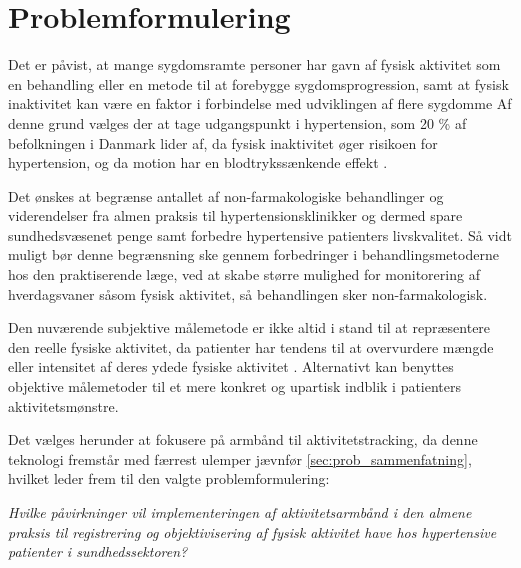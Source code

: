 \section{Problemformulering}


Det er påvist, at mange sygdomsramte personer har gavn af fysisk aktivitet som en behandling eller en metode til at forebygge sygdomsprogression, samt at fysisk inaktivitet kan være en faktor i forbindelse med udviklingen af flere sygdomme \citep{motionsraad2007,pedersen2011}
Af denne grund vælges der at tage udgangspunkt i hypertension, som 20 \% af befolkningen i Danmark lider af, da fysisk inaktivitet øger risikoen for hypertension, og da motion har en blodtrykssænkende effekt \citep{pedersen2011,olsen2015}. 

Det ønskes at begrænse antallet af non-farmakologiske behandlinger og viderendelser fra almen praksis til hypertensionsklinikker og dermed spare sundhedsvæsenet penge samt forbedre hypertensive patienters livskvalitet. Så vidt muligt bør denne begrænsning ske gennem forbedringer i behandlingsmetoderne hos den praktiserende læge, ved at skabe større mulighed for monitorering af hverdagsvaner såsom fysisk aktivitet, så behandlingen sker non-farmakologisk.

Den nuværende subjektive målemetode er ikke altid i stand til at repræsentere den reelle fysiske aktivitet, da patienter har tendens til at overvurdere mængde eller intensitet af deres ydede fysiske aktivitet \citep{motionsraad2007,pedersen2011,adamo2009}
. Alternativt kan benyttes objektive målemetoder til et mere konkret og upartisk indblik i patienters aktivitetsmønstre. 

Det vælges herunder at fokusere på armbånd til aktivitetstracking, da denne teknologi fremstår med færrest ulemper jævnfør \autoref{sec:prob_sammenfatning}, hvilket leder frem til den valgte problemformulering: 


\begin{center}
\textit{Hvilke påvirkninger vil implementeringen af aktivitetsarmbånd i den almene praksis til registrering og objektivisering af fysisk aktivitet have hos hypertensive patienter i sundhedssektoren?}
\end{center}